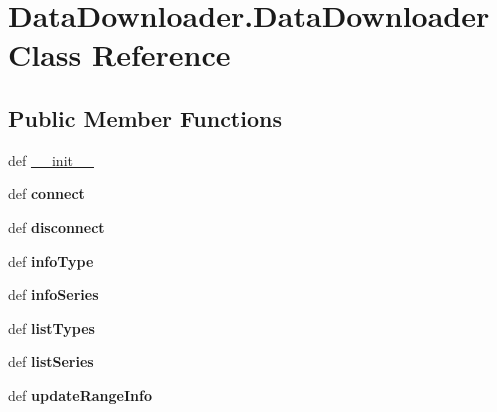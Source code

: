 \hypertarget{classDataDownloader_1_1DataDownloader}{\section{\-Data\-Downloader.\-Data\-Downloader \-Class \-Reference}
\label{classDataDownloader_1_1DataDownloader}
}
\subsection*{\-Public \-Member \-Functions}
\begin{DoxyCompactItemize}
\item 
def \hyperlink{classDataDownloader_1_1DataDownloader_a68d6311623be2180f7528b8be8857e59}{\-\_\-\-\_\-init\-\_\-\-\_\-}
\item 
\hypertarget{classDataDownloader_1_1DataDownloader_a8e32e72ffb9cc69e1f9268d698a753cb}{def {\bfseries connect}}\label{classDataDownloader_1_1DataDownloader_a8e32e72ffb9cc69e1f9268d698a753cb}

\item 
\hypertarget{classDataDownloader_1_1DataDownloader_ae867a6091477c7942aefc799de3f4338}{def {\bfseries disconnect}}\label{classDataDownloader_1_1DataDownloader_ae867a6091477c7942aefc799de3f4338}

\item 
\hypertarget{classDataDownloader_1_1DataDownloader_ac93efb34fa941f866d246e3279072450}{def {\bfseries info\-Type}}\label{classDataDownloader_1_1DataDownloader_ac93efb34fa941f866d246e3279072450}

\item 
\hypertarget{classDataDownloader_1_1DataDownloader_ab4c72724fc9b3df882021135249829e3}{def {\bfseries info\-Series}}\label{classDataDownloader_1_1DataDownloader_ab4c72724fc9b3df882021135249829e3}

\item 
\hypertarget{classDataDownloader_1_1DataDownloader_a2f66ece2d60af545d496a5b4de8ad9cb}{def {\bfseries list\-Types}}\label{classDataDownloader_1_1DataDownloader_a2f66ece2d60af545d496a5b4de8ad9cb}

\item 
\hypertarget{classDataDownloader_1_1DataDownloader_ad3ab80632d237bab85c6f6d549010e37}{def {\bfseries list\-Series}}\label{classDataDownloader_1_1DataDownloader_ad3ab80632d237bab85c6f6d549010e37}

\item 
\hypertarget{classDataDownloader_1_1DataDownloader_a8520b81bab96a6c8c852513d99fa2388}{def {\bfseries update\-Range\-Info}}\label{classDataDownloader_1_1DataDownloader_a8520b81bab96a6c8c852513d99fa2388}


\end{DoxyCompactItemize}
